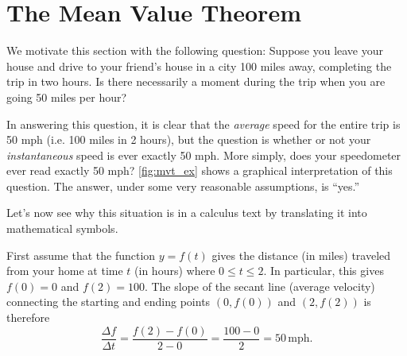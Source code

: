 \section{The Mean Value Theorem}\label{sec:mvt}

We motivate this section with the following question: Suppose you leave your house and drive to your friend's house in a city 100 miles away, completing the trip in two hours.  Is there necessarily a moment during the trip when you are going 50 miles per hour?

In answering this question, it is clear that the \emph{average} speed for the entire trip is 50 mph (i.e. 100 miles in 2 hours), but the question is whether or not your \emph{instantaneous} speed is ever exactly 50 mph. More simply, does your speedometer ever read exactly 50 mph?  \autoref{fig:mvt_ex} shows a graphical interpretation of this question.  The answer, under some very reasonable assumptions, is ``yes.''


Let's now see why this situation is in a calculus text by translating it into mathematical symbols.\bigbreak

First assume that the function $y = f(t)$ gives the distance (in miles) traveled from your home at time $t$ (in hours) where $0\le t\le 2$.  In particular, this gives $f(0)=0$ and $f(2)=100$.  The slope of the secant line (average velocity) connecting the starting and ending points $(0,f(0))$ and $(2,f(2))$ is therefore 
\[
\frac{\Delta f}{\Delta t} = \frac{f(2)-f(0)}{2-0} = \frac{100-0}{2} = 50 \, \text{mph}.
\]

